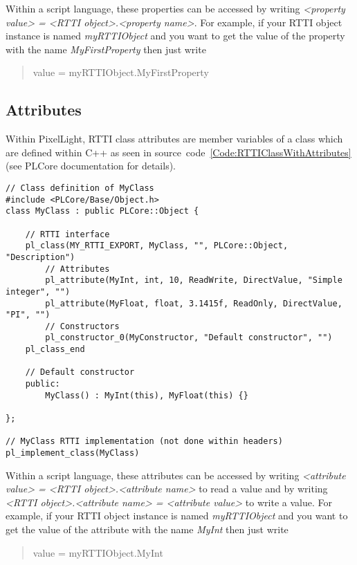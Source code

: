 Within a script language, these properties can be accessed by writing \emph{<property value> = <RTTI object>.<property name>}. For example, if your RTTI object instance is named \emph{myRTTIObject} and you want to get the value of the property with the name \emph{MyFirstProperty} then just write \begin{quote}value = myRTTIObject.MyFirstProperty\end{quote}


\subsection{Attributes}
Within PixelLight, RTTI class attributes are member variables of a class which are defined within C++ as seen in source~code~\ref{Code:RTTIClassWithAttributes} (see PLCore documentation for details).
\begin{lstlisting}[label=Code:RTTIClassWithAttributes,caption={Defining a new RTTI class with attributes (C++)}]
// Class definition of MyClass
#include <PLCore/Base/Object.h>
class MyClass : public PLCore::Object {

	// RTTI interface
	pl_class(MY_RTTI_EXPORT, MyClass, "", PLCore::Object, "Description")
		// Attributes
		pl_attribute(MyInt, int, 10, ReadWrite, DirectValue, "Simple integer", "")
		pl_attribute(MyFloat, float, 3.1415f, ReadOnly, DirectValue, "PI", "")
		// Constructors
		pl_constructor_0(MyConstructor, "Default constructor", "")
	pl_class_end

	// Default constructor
	public:
		MyClass() : MyInt(this), MyFloat(this) {}

};

// MyClass RTTI implementation (not done within headers)
pl_implement_class(MyClass)
\end{lstlisting}

Within a script language, these attributes can be accessed by writing \emph{<attribute value> = <RTTI object>.<attribute name>} to read a value and by writing \emph{<RTTI object>.<attribute name> = <attribute value>} to write a value. For example, if your RTTI object instance is named \emph{myRTTIObject} and you want to get the value of the attribute with the name \emph{MyInt} then just write \begin{quote}value = myRTTIObject.MyInt\end{quote}


